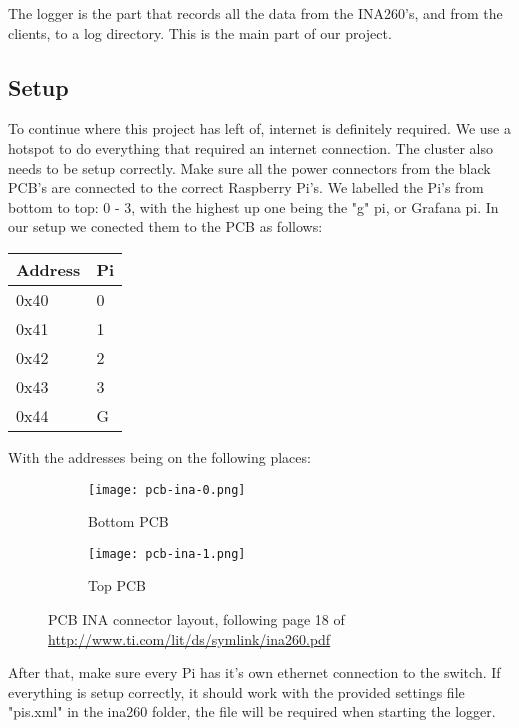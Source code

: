 The logger is the part that records all the data from the INA260's, and from the clients, to a log directory. This is the main part of our project.
\subsection{Setup} \label{lsetup}
To continue where this project has left of, internet is definitely required. We use a hotspot to do everything that required an internet connection.\newline
The cluster also needs to be setup correctly. Make sure all the power connectors from the black PCB's are connected to the correct Raspberry Pi's. We labelled the Pi's from bottom to top: 0 - 3, with the highest up one being the "g" pi, or Grafana pi. In our setup we conected them to the PCB as follows:
\begin{table}[h]
\centering
\begin{tabular}{|l|l|}
\hline
Address & Pi \\ \hline
0x40 & 0 \\ \hline
0x41 & 1 \\ \hline
0x42 & 2 \\ \hline
0x43 & 3 \\ \hline
0x44 & G \\ \hline
\end{tabular}
\end{table}
\newline
With the addresses being on the following places:
\begin{figure}[h]
	\centering
	\begin{subfigure}[b]{0.4\linewidth}
    		\texttt{[image: pcb-ina-0.png]}
    		\caption{Bottom PCB}
    	\end{subfigure}
    \begin{subfigure}[b]{0.4\linewidth}
    		\texttt{[image: pcb-ina-1.png]}
    		\caption{Top PCB}
    \end{subfigure}
    \caption{PCB INA connector layout, following page 18 of \url{http://www.ti.com/lit/ds/symlink/ina260.pdf}}
    \label{inapcb}
\end{figure}\newline
After that, make sure every Pi has it's own ethernet connection to the switch. If everything is setup correctly, it should work with the provided settings file "pis.xml" in the ina260 folder, the file will be required when starting the logger.\newline
\newline
